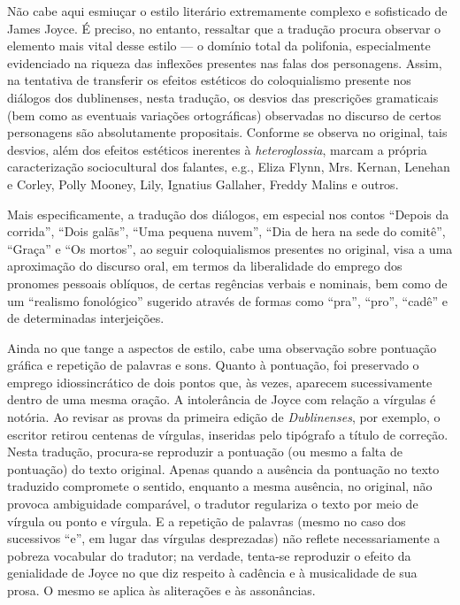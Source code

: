 Não cabe aqui esmiuçar o estilo literário extremamente complexo e sofisticado de
James Joyce. É preciso, no entanto, ressaltar que a tradução procura observar o
elemento mais vital desse estilo --- o domínio total da polifonia, especialmente
evidenciado na riqueza das inflexões presentes nas falas dos personagens.
Assim, na tentativa de transferir os efeitos estéticos do coloquialismo
presente nos diálogos dos dublinenses, nesta tradução, os desvios das
prescrições gramaticais (bem como as eventuais variações ortográficas)
observadas no discurso de certos personagens são absolutamente propositais.
Conforme se observa no original, tais desvios, além dos efeitos estéticos
inerentes à \textit{heteroglossia}, marcam a própria caracterização
sociocultural dos falantes, e.g., Eliza Flynn, Mrs. Kernan, Lenehan e Corley,
Polly Mooney, Lily, Ignatius Gallaher, Freddy Malins e outros.

Mais especificamente, a tradução dos diálogos, em especial nos contos “Depois da
corrida”, “Dois galãs”, “Uma pequena nuvem”, “Dia de hera na sede do comitê”,
“Graça” e “Os mortos”, ao seguir coloquialismos presentes no original, visa a
uma aproximação do discurso oral, em termos da liberalidade do emprego dos
pronomes pessoais oblíquos, de certas regências verbais e nominais, bem como de
um “realismo fonológico” sugerido através de formas como “pra”, “pro”, “cadê” e
de determinadas interjeições.

Ainda no que tange a aspectos de estilo, cabe uma observação sobre pontuação
gráfica e repetição de palavras e sons. Quanto à pontuação, foi preservado o
emprego idiossincrático de dois pontos que, às vezes, aparecem sucessivamente
dentro de uma mesma oração. A intolerância de Joyce com relação a vírgulas é
notória. Ao revisar as provas da primeira edição de \textit{Dublinenses}, por
exemplo, o escritor retirou centenas de vírgulas, inseridas pelo tipógrafo a
título de correção. Nesta tradução, procura-se reproduzir a pontuação (ou mesmo
a falta de pontuação) do texto original. Apenas quando a ausência da pontuação
no texto traduzido compromete o sentido, enquanto a mesma ausência, no
original, não provoca ambiguidade comparável, o tradutor regulariza o texto por
meio de vírgula ou ponto e vírgula.  E a repetição de palavras (mesmo no caso
dos sucessivos “e”, em lugar das vírgulas desprezadas) não reflete
necessariamente a pobreza vocabular do tradutor; na verdade, tenta-se
reproduzir o efeito da genialidade de Joyce no que diz respeito à cadência e à
musicalidade de sua prosa. O mesmo se aplica às aliterações e às assonâncias.

